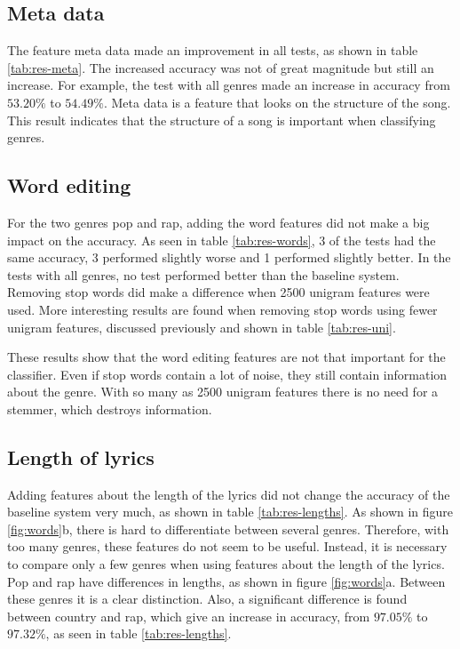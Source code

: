 \documentclass[a4paper, 12pt]{article}
\begin{document}
\subsection{Meta data}
The feature meta data made an improvement in all tests, as shown in table \ref{tab:res-meta}.
The increased accuracy was not of great magnitude but still an increase.
For example, the test with all genres made an increase in accuracy from $53.20\%$ to $54.49 \%$.
Meta data is a feature that looks on the structure of the song.
This result indicates that the structure of a song is important when classifying genres.

\subsection{Word editing}
For the two genres pop and rap, adding the word features did not make a big impact on the accuracy.
As seen in table \ref{tab:res-words}, 3 of the tests had the same accuracy, 3 performed slightly worse and 1 performed slightly better.
In the tests with all genres, no test performed better than the baseline system.
Removing stop words did make a difference when 2500 unigram features were used.
More interesting results are found when removing stop words using fewer unigram features, discussed previously and shown in table \ref{tab:res-uni}.

These results show that the word editing features are not that important for the classifier.
Even if stop words contain a lot of noise, they still contain information about the genre.
With so many as 2500 unigram features there is no need for a stemmer, which destroys information.

\subsection{Length of lyrics}
Adding features about the length of the lyrics did not change the accuracy of the baseline system very much, as shown in table \ref{tab:res-lengths}.
As shown in figure \ref{fig:words}b, there is hard to differentiate between several genres.
Therefore, with too many genres, these features do not seem to be useful.
Instead, it is necessary to compare only a few genres when using features about the length of the lyrics.
Pop and rap have differences in lengths, as shown in figure \ref{fig:words}a.
Between these genres it is a clear distinction.
Also, a significant difference is found between country and rap, which give an increase in accuracy, from $97.05\%$ to $97.32\%$, as seen in table \ref{tab:res-lengths}.
\end{document}
